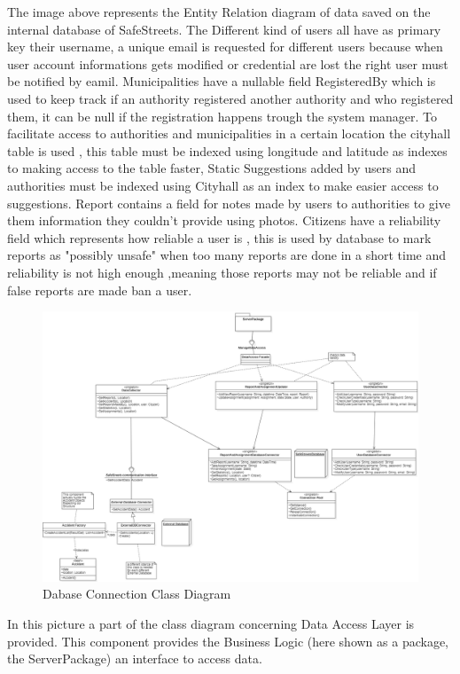 The image above represents the Entity Relation diagram of data saved on the internal database of SafeStreets. The Different kind of users all have as primary key their username, a unique email is requested for different users because when user account informations gets modified or credential are lost the right user must be notified by eamil. Municipalities have a nullable field RegisteredBy which is used to keep track if an authority registered another authority and who registered them, it can be null if the registration happens trough the system manager. To facilitate access to authorities and municipalities in a certain location the cityhall table is used , this table must be indexed using longitude and latitude as indexes to making access to the table faster,
Static Suggestions added by users and authorities must be indexed using Cityhall as an index to make easier access to suggestions.
Report contains a field for notes made by users to authorities to give them information they couldn't provide using photos.
Citizens have a reliability field which represents how reliable a user is , this is used by database to mark reports as "possibly unsafe"  when too many reports are done in a short time and reliability is not high enough ,meaning those reports may not be reliable and if false reports are made ban a user.
\begin{figure}[H]
\centering
\includegraphics[width=\textwidth]{Images/DatabaseConnectionClassDiagram.png}
\caption{\label{fig:ComWI}Dabase Connection Class Diagram }
\end{figure}
In this picture a part of the class diagram concerning Data Access Layer is provided.
This component provides the Business Logic (here shown as a package, the ServerPackage) an interface to access data.

